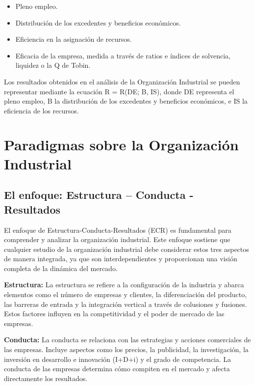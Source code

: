 \documentclass[
  doc,
  floatsintext,
  longtable,
  a4paper,
  nolmodern,
  notxfonts,
  notimes,
  colorlinks=true,linkcolor=blue,citecolor=blue,urlcolor=blue]{apa7}
\providecommand{\tightlist}{%
  \setlength{\itemsep}{0pt}\setlength{\parskip}{0pt}}
\begin{document}
\begin{itemize}
\tightlist
\item
  Pleno empleo.
\item
  Distribución de los excedentes y beneficios económicos.
\item
  Eficiencia en la asignación de recursos.
\item
  Eficacia de la empresa, medida a través de ratios e índices de
  solvencia, liquidez o la Q de Tobin.
\end{itemize}

Los resultados obtenidos en el análisis de la Organización Industrial se
pueden representar mediante la ecuación R = R(DE; B, IS), donde DE
representa el pleno empleo, B la distribución de los excedentes y
beneficios económicos, e IS la eficiencia de los recursos.

\section{Paradigmas sobre la Organización
Industrial}\label{paradigmas-sobre-la-organizaciuxf3n-industrial}

\subsection{El enfoque: Estructura -- Conducta -
Resultados}\label{el-enfoque-estructura-conducta---resultados}

El enfoque de Estructura-Conducta-Resultados (ECR) es fundamental para
comprender y analizar la organización industrial. Este enfoque sostiene
que cualquier estudio de la organización industrial debe considerar
estos tres aspectos de manera integrada, ya que son interdependientes y
proporcionan una visión completa de la dinámica del mercado.

\textbf{Estructura:} La estructura se refiere a la configuración de la
industria y abarca elementos como el número de empresas y clientes, la
diferenciación del producto, las barreras de entrada y la integración
vertical a través de colusiones y fusiones. Estos factores influyen en
la competitividad y el poder de mercado de las empresas.

\textbf{Conducta:} La conducta se relaciona con las estrategias y
acciones comerciales de las empresas. Incluye aspectos como los precios,
la publicidad, la investigación, la inversión en desarrollo e innovación
(I+D+i) y el grado de competencia. La conducta de las empresas determina
cómo compiten en el mercado y afecta directamente los resultados.
\end{document}
